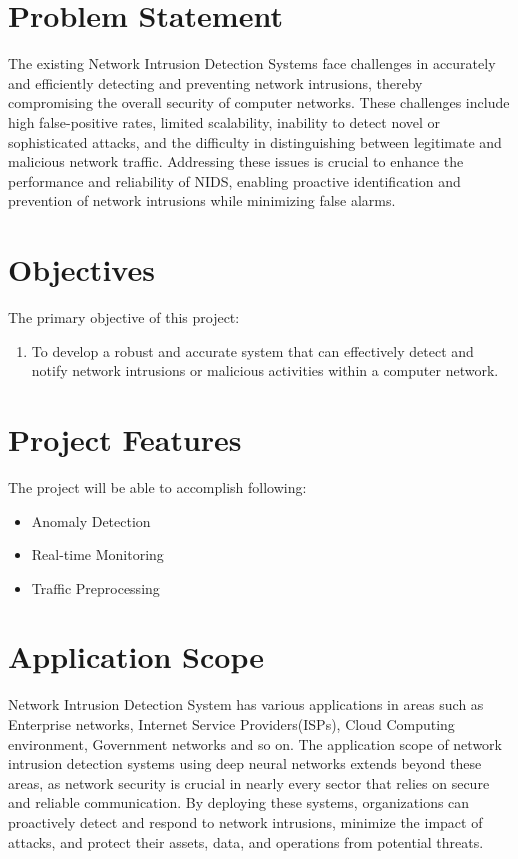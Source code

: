 \section{Problem Statement}
\vspace{-18pt}
The existing Network Intrusion Detection Systems face challenges in accurately and efficiently detecting and preventing network intrusions, thereby compromising the overall security of computer networks. These challenges include high false-positive rates, limited scalability, inability to detect novel or sophisticated attacks, and the difficulty in distinguishing between legitimate and malicious network traffic. Addressing these issues is crucial to enhance the performance and reliability of NIDS, enabling proactive identification and prevention of network intrusions while minimizing false alarms.
\section{Objectives}
\vspace{-18pt}
The primary objective of this project:
\vspace{-18pt}
\begin{enumerate}[label=\roman*.]
\item To develop a robust and accurate system that can effectively detect and notify network intrusions or malicious activities within a computer network.
\end{enumerate}
\section{Project Features}
\vspace{-18pt}
The project will be able to accomplish following:
\vspace{-18pt}
\begin{itemize}
\item Anomaly Detection
\item Real-time Monitoring
\item Traffic Preprocessing
\end{itemize}
\section{Application Scope}
\vspace{-18pt}
Network Intrusion Detection System has various applications in areas such as Enterprise networks, Internet Service Providers(ISPs), Cloud Computing environment, Government networks and so on. The application scope of network intrusion detection systems using deep neural networks extends beyond these areas, as network security is crucial in nearly every sector that relies on secure and reliable communication. By deploying these systems, organizations can proactively detect and respond to network intrusions, minimize the impact of attacks, and protect their assets, data, and operations from potential threats.
